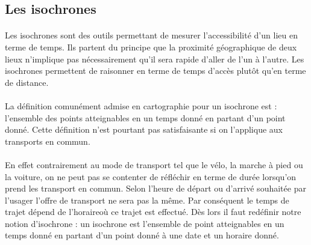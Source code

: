 \documentclass[a4paper]{report}
\begin{document}
\subsection{Les isochrones}

\paragraph{}Les isochrones sont des outils permettant de mesurer l'accessibilité d'un lieu en terme de temps. Ils partent du principe que la proximité géographique de deux lieux n'implique pas nécessairement qu'il sera rapide d'aller de l'un à l'autre. Les isochrones permettent de raisonner en terme de temps d'accès plutôt qu'en terme de distance.

\paragraph{}La définition comunément admise en cartographie pour un isochrone est : l'ensemble des points atteignables en un temps donné en partant d'un point donné. Cette définition n'est pourtant pas satisfaisante si on l'applique aux transports en commun. 

\paragraph{}En effet contrairement au mode de transport tel que le vélo, la marche à pied ou la voiture, on ne peut pas se contenter de réfléchir en terme de durée lorsqu'on prend les transport en commun. Selon l'heure de départ ou d'arrivé souhaitée par l'usager l'offre de transport ne sera pas la même. Par conséquent le temps de trajet dépend de l'horaireoù ce trajet est effectué. Dès lors il faut redéfinir notre notion d'isochrone : un isochrone est l'ensemble de point atteignables en un temps donné en partant d'un point donné à une date et un horaire donné.
\end{document}
